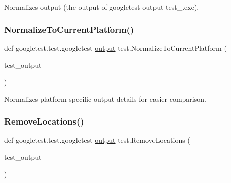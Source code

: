 \begin{DoxyVerb}Normalizes output (the output of googletest-output-test_.exe).\end{DoxyVerb}
 \mbox{\label{namespacegoogletest_1_1test_1_1googletest-output-test_a5fc239cf98d093a53237164567c37e3e}} 
\subsubsection{\texorpdfstring{NormalizeToCurrentPlatform()}{NormalizeToCurrentPlatform()}}
{\footnotesize\ttfamily def googletest.\+test.\+googletest-\/\mbox{\hyperlink{namespacegoogletest_1_1test_1_1googletest-output-test_a6773c2217ae4694b4db5610620562437}{output}}-\/test.\+Normalize\+To\+Current\+Platform (\begin{DoxyParamCaption}\item[{}]{test\+\_\+output }\end{DoxyParamCaption})}

\begin{DoxyVerb}Normalizes platform specific output details for easier comparison.\end{DoxyVerb}
 \mbox{\label{namespacegoogletest_1_1test_1_1googletest-output-test_a8887aec81bfc96f81fa1d252b5a6d01d}} 
\subsubsection{\texorpdfstring{RemoveLocations()}{RemoveLocations()}}
{\footnotesize\ttfamily def googletest.\+test.\+googletest-\/\mbox{\hyperlink{namespacegoogletest_1_1test_1_1googletest-output-test_a6773c2217ae4694b4db5610620562437}{output}}-\/test.\+Remove\+Locations (\begin{DoxyParamCaption}\item[{}]{test\+\_\+output }\end{DoxyParamCaption})}

